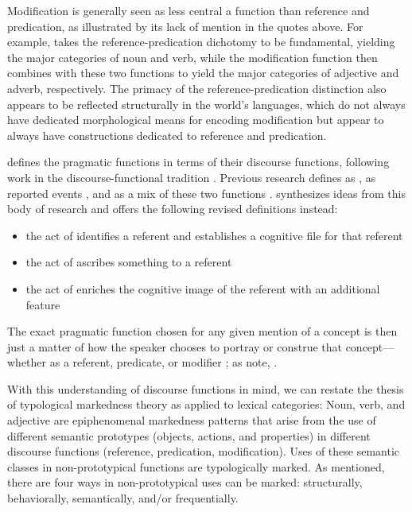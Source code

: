 Modification is generally seen as less central a function than reference and predication, as illustrated by its lack of mention in the quotes above. For example, \textcite[55]{Hengeveld1992} takes the reference-predication dichotomy to be fundamental, yielding the major categories of noun and verb, while the modification function then combines with these two functions to yield the major categories of adjective and adverb, respectively. The primacy of the reference-predication distinction also appears to be reflected structurally in the world's languages, which do not always have dedicated morphological means for encoding modification but appear to always have constructions dedicated to reference and predication.

\textcite[123]{Croft1991} defines the pragmatic functions in terms of their discourse functions, following work in the discourse-functional tradition \parencites{Chafe1976}{HopperThompson1984}{Chafe1987}{DuBois1987}. Previous research defines  as ,  as reported events \parencite[726]{HopperThompson1984}, and  as a mix of these two functions \parencite{Thompson1989}. \textcite[123]{Croft1991} synthesizes ideas from this body of research and offers the following revised definitions instead:

\begin{itemize}
  \item the act of  identifies a referent and establishes a cognitive file for that referent
  \item the act of  ascribes something to a referent
  \item the act of  enriches the cognitive image of the referent with an additional feature
\end{itemize}

\noindent The exact pragmatic function chosen for any given mention of a concept is then just a matter of how the speaker chooses to portray or construe that concept—whether as a referent, predicate, or modifier \parencite[100]{Croft1991}; as \citeauthor{CroftLier2012} note, .

With this understanding of discourse functions in mind, we can restate the thesis of typological markedness theory as applied to lexical categories: Noun, verb, and adjective are epiphenomenal markedness patterns that arise from the use of different semantic prototypes (objects, actions, and properties) in different discourse functions (reference, predication, modification). Uses of these semantic classes in non-prototypical functions are typologically marked. As mentioned, there are four ways in non-prototypical uses can be marked: structurally, behaviorally, semantically, and/or frequentially.

